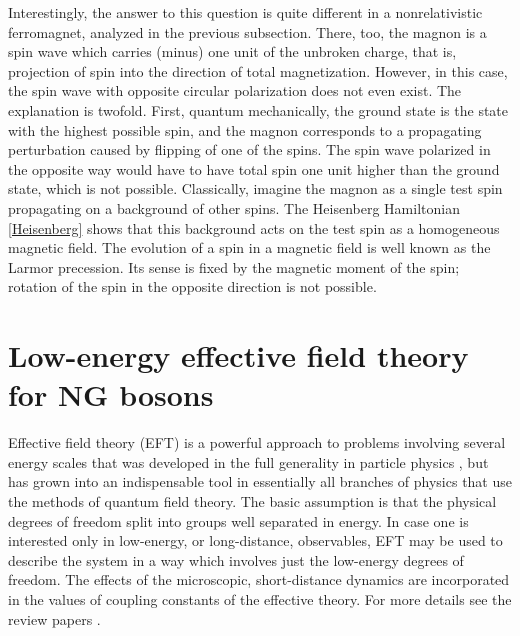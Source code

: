 \documentclass[final,2p,times,12pt,sort&compress]{elsarticle}
\begin{document}
Interestingly, the answer to this question is quite different in a
nonrelativistic ferromagnet, analyzed in the previous subsection. There, too,
the magnon is a spin wave which carries (minus) one unit of the unbroken
charge, that is, projection of spin into the direction of total magnetization.
However, in this case, the spin wave with opposite circular polarization does
not even exist. The explanation is twofold. First, quantum mechanically, the
ground state is the state with the highest possible spin, and the magnon
corresponds to a propagating perturbation caused by flipping of one of the
spins. The spin wave polarized in the opposite way would have to have total
spin one unit higher than the ground state, which is not possible. Classically,
imagine the magnon as a single test spin propagating on a background of other
spins. The Heisenberg Hamiltonian \eqref{Heisenberg} shows that this background
acts on the test spin as a homogeneous magnetic field. The evolution of a spin
in a magnetic field is well known as the Larmor precession. Its sense is fixed
by the magnetic moment of the spin; rotation of the spin in the opposite
direction is not possible.


\section{Low-energy effective field theory for NG bosons}
\label{sec:EFT}
Effective field theory (EFT) is a powerful approach to problems involving
several energy scales that was developed in the full generality in particle
physics \cite{Weinberg:1978kz}, but has grown into an indispensable tool in
essentially all branches of physics that use the methods of quantum field
theory. The basic assumption is that the physical degrees of freedom split into
groups well separated in energy. In case one is interested only in
low-energy, or long-distance, observables, EFT may be used to describe the
system in a way which involves just the low-energy degrees of freedom. The
effects of the microscopic, short-distance dynamics are incorporated in the
values of coupling constants of the effective theory. For more details see the
review papers \cite{Georgi:1994qn,Kaplan:1995uv,Manohar:1996cq,Pich:1998xt}.
\end{document}
